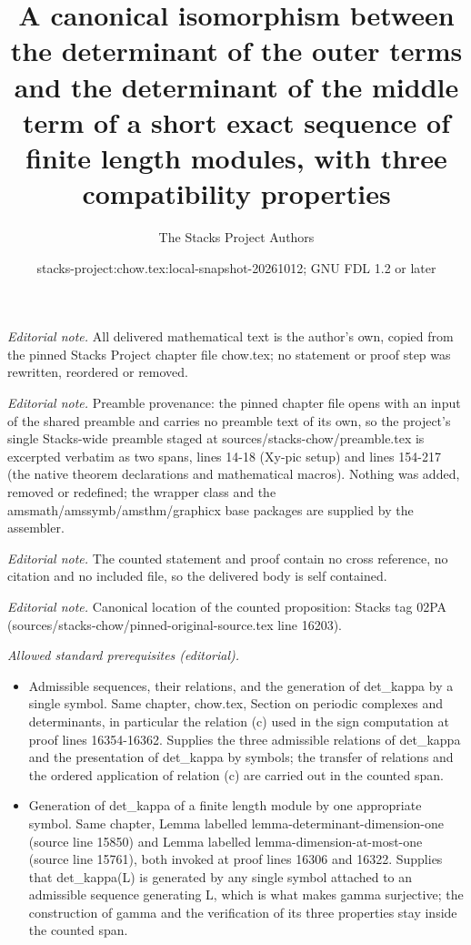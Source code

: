 \documentclass[10pt,a4paper]{amsart}
\title{A canonical isomorphism between the determinant of the outer terms and the determinant of the middle term of a short exact sequence of finite length modules, with three compatibility properties}
\author{The Stacks Project Authors}
\date{stacks-project:chow.tex:local-snapshot-20261012; GNU FDL 1.2 or later}
\theoremstyle{plain}
\theoremstyle{definition}
\theoremstyle{remark}
\numberwithin{equation}{subsection}
\begin{document}
\maketitle
\noindent\textit{Editorial note.} All delivered mathematical text is the author's own, copied from the pinned Stacks Project chapter file chow.tex; no statement or proof step was rewritten, reordered or removed.\par\medskip
\noindent\textit{Editorial note.} Preamble provenance: the pinned chapter file opens with an input of the shared preamble and carries no preamble text of its own, so the project's single Stacks-wide preamble staged at sources/stacks-chow/preamble.tex is excerpted verbatim as two spans, lines 14-18 (Xy-pic setup) and lines 154-217 (the native theorem declarations and mathematical macros). Nothing was added, removed or redefined; the wrapper class and the amsmath/amssymb/amsthm/graphicx base packages are supplied by the assembler.\par\medskip
\noindent\textit{Editorial note.} The counted statement and proof contain no cross reference, no citation and no included file, so the delivered body is self contained.\par\medskip
\noindent\textit{Editorial note.} Canonical location of the counted proposition: Stacks tag 02PA (sources/stacks-chow/pinned-original-source.tex line 16203).\par\medskip
\noindent\textit{Allowed standard prerequisites (editorial).}\begin{itemize}
\item Admissible sequences, their relations, and the generation of det\_kappa by a single symbol. Same chapter, chow.tex, Section on periodic complexes and determinants, in particular the relation (c) used in the sign computation at proof lines 16354-16362. Supplies the three admissible relations of det\_kappa and the presentation of det\_kappa by symbols; the transfer of relations and the ordered application of relation (c) are carried out in the counted span.
\item Generation of det\_kappa of a finite length module by one appropriate symbol. Same chapter, Lemma labelled lemma-determinant-dimension-one (source line 15850) and Lemma labelled lemma-dimension-at-most-one (source line 15761), both invoked at proof lines 16306 and 16322. Supplies that det\_kappa(L) is generated by any single symbol attached to an admissible sequence generating L, which is what makes gamma surjective; the construction of gamma and the verification of its three properties stay inside the counted span.
\end{itemize}\medskip
\end{document}
